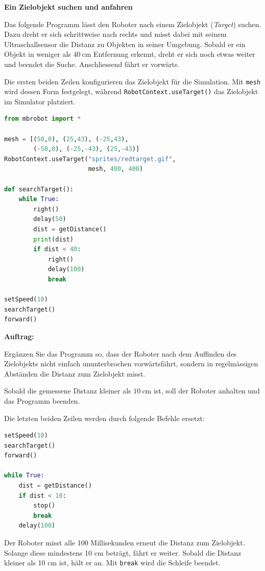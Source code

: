 \begin{myexercise}
    \textbf{Ein Zielobjekt suchen und anfahren}

    Das folgende Programm lässt den Roboter nach einem
    Zielobjekt (\emph{Target}) suchen. Dazu dreht er sich
    schrittweise nach rechts und misst dabei mit seinem
    Ultraschallsensor die Distanz zu Objekten in seiner
    Umgebung. Sobald er ein Objekt in weniger als
    \(\SI{40}{\centi\meter}\) Entfernung erkennt,
    dreht er sich noch etwas weiter und beendet die Suche.
    Anschliessend fährt er vorwärts.

    Die ersten beiden Zeilen konfigurieren das Zielobjekt
    für die Simulation. Mit \texttt{mesh} wird dessen
    Form festgelegt, während \texttt{RobotContext.useTarget()}
    das Zielobjekt im Simulator platziert.

    \begin{lstlisting}[language=Python]
from mbrobot import *

mesh = [(50,0), (25,43), (-25,43),
        (-50,0), (-25,-43), (25,-43)]
RobotContext.useTarget("sprites/redtarget.gif",
                       mesh, 400, 400)

def searchTarget():
    while True:
        right()
        delay(50)
        dist = getDistance()
        print(dist)
        if dist < 40:
            right()
            delay(100)
            break

setSpeed(10)
searchTarget()
forward()
    \end{lstlisting}

    \textbf{Auftrag:}

    Ergänzen Sie das Programm so, dass der Roboter nach
    dem Auffinden des Zielobjekts nicht einfach
    ununterbrochen vorwärtsfährt, sondern in regelmässigen
    Abständen die Distanz zum Zielobjekt misst.

    Sobald die gemessene Distanz kleiner als
    \(\SI{10}{\centi\meter}\) ist, soll der Roboter
    anhalten und das Programm beenden.

    \begin{myanswer}
        Die letzten beiden Zeilen werden durch
        folgende Befehle ersetzt:

        \begin{lstlisting}[language=Python]
setSpeed(10)
searchTarget()
forward()

while True:
    dist = getDistance()
    if dist < 10:
        stop()
        break
    delay(100)
        \end{lstlisting}

        Der Roboter misst alle 100 Millisekunden erneut
        die Distanz zum Zielobjekt. Solange diese mindestens
        10 cm beträgt, fährt er weiter. Sobald die
        Distanz kleiner als 10 cm ist, hält er an.
        Mit \texttt{break} wird die Schleife beendet.
    \end{myanswer}
\end{myexercise}


